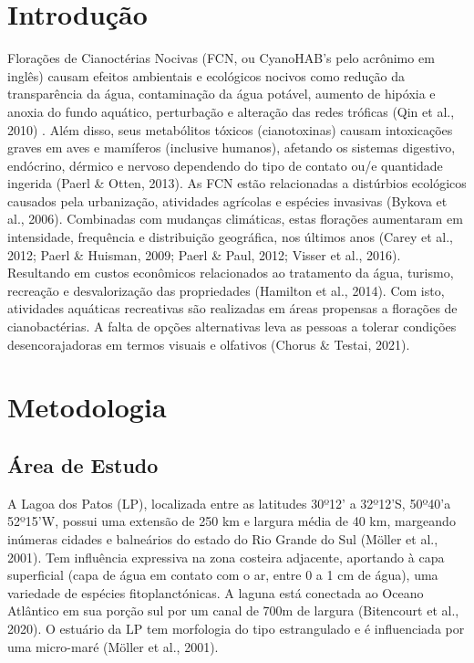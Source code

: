 \documentclass[
  super,
  preprint,
  3p]{elsarticle}
\begin{document}
    \ifdefined\Shaded\renewenvironment{Shaded}{\begin{tcolorbox}[borderline west={3pt}{0pt}{shadecolor}, breakable, sharp corners, interior hidden, boxrule=0pt, enhanced, frame hidden]}{\end{tcolorbox}}\fi

\hypertarget{introduuxe7uxe3o}{%
\section{Introdução}\label{introduuxe7uxe3o}}

Florações de Cianoctérias Nocivas (FCN, ou CyanoHAB's pelo acrônimo em
inglês) causam efeitos ambientais e ecológicos nocivos como redução da
transparência da água, contaminação da água potável, aumento de hipóxia
e anoxia do fundo aquático, perturbação e alteração das redes tróficas
(Qin et al., 2010) \citet{qin}. Além disso, seus metabólitos tóxicos
(cianotoxinas) causam intoxicações graves em aves e mamíferos (inclusive
humanos), afetando os sistemas digestivo, endócrino, dérmico e nervoso
dependendo do tipo de contato ou/e quantidade ingerida (Paerl \& Otten,
2013). As FCN estão relacionadas a distúrbios ecológicos causados pela
urbanização, atividades agrícolas e espécies invasivas (Bykova et al.,
2006). Combinadas com mudanças climáticas, estas florações aumentaram em
intensidade, frequência e distribuição geográfica, nos últimos anos
(Carey et al., 2012; Paerl \& Huisman, 2009; Paerl \& Paul, 2012; Visser
et al., 2016). Resultando em custos econômicos relacionados ao
tratamento da água, turismo, recreação e desvalorização das propriedades
(Hamilton et al., 2014). Com isto, atividades aquáticas recreativas são
realizadas em áreas propensas a florações de cianobactérias. A falta de
opções alternativas leva as pessoas a tolerar condições desencorajadoras
em termos visuais e olfativos (Chorus \& Testai, 2021).

\hypertarget{metodologia}{%
\section{Metodologia}\label{metodologia}}

\hypertarget{uxe1rea-de-estudo}{%
\subsection{Área de Estudo}\label{uxe1rea-de-estudo}}

A Lagoa dos Patos (LP), localizada entre as latitudes 30º12' a 32º12'S,
50º40'a 52º15'W, possui uma extensão de 250 km e largura média de 40 km,
margeando inúmeras cidades e balneários do estado do Rio Grande do Sul
(Möller et al., 2001). Tem influência expressiva na zona costeira
adjacente, aportando à capa superficial (capa de água em contato com o
ar, entre 0 a 1 cm de água), uma variedade de espécies fitoplanctónicas.
A laguna está conectada ao Oceano Atlântico em sua porção sul por um
canal de 700m de largura (Bitencourt et al., 2020). O estuário da LP tem
morfologia do tipo estrangulado e é influenciada por uma micro-maré
(Möller et al., 2001).
\end{document}
